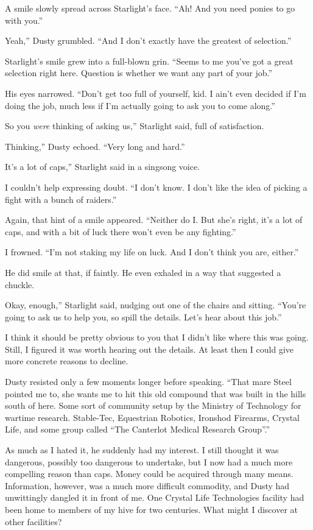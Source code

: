 A smile slowly spread across Starlight’s face. “Ah! And you need ponies to go with you.”

\leavevmode{}Yeah,” Dusty grumbled. “And I don’t exactly have the greatest of selection.”

Starlight’s smile grew into a full-blown grin. “Seems to me you’ve got a great selection right here. Question is whether we want any part of your job.”

His eyes narrowed. “Don’t get too full of yourself, kid. I ain’t even decided if I’m doing the job, much less if I’m actually going to ask you to come along.”

\leavevmode{}So you \textit{were} thinking of asking us,” Starlight said, full of satisfaction.

\leavevmode{}Thinking,” Dusty echoed. “Very long and hard.”

\leavevmode{}It’s a lot of caps,” Starlight said in a singsong voice.

I couldn’t help expressing doubt. “I don’t know. I don’t like the idea of picking a fight with a bunch of raiders.”

Again, that hint of a smile appeared. “Neither do I. But she’s right, it’s a lot of caps, and with a bit of luck there won’t even be any fighting.”

I frowned. “I’m not staking my life on luck. And I don’t think you are, either.”

He did smile at that, if faintly. He even exhaled in a way that suggested a chuckle.

\leavevmode{}Okay, enough,” Starlight said, nudging out one of the chairs and sitting. “You’re going to ask us to help you, so spill the details. Let’s hear about this job.”

I think it should be pretty obvious to you that I didn’t like where this was going. Still, I figured it was worth hearing out the details. At least then I could give more concrete reasons to decline.

Dusty resisted only a few moments longer before speaking. “That mare Steel pointed me to, she wants me to hit this old compound that was built in the hills south of here. Some sort of community setup by the Ministry of Technology for wartime research. Stable-Tec, Equestrian Robotics, Ironshod Firearms, Crystal Life, and some group called “The Canterlot Medical Research Group”.”

As much as I hated it, he suddenly had my interest. I still thought it was dangerous, possibly too dangerous to undertake, but I now had a much more compelling reason than caps. Money could be acquired through many means. Information, however, was a much more difficult commodity, and Dusty had unwittingly dangled it in front of me. One Crystal Life Technologies facility had been home to members of my hive for two centuries. What might I discover at other facilities?

